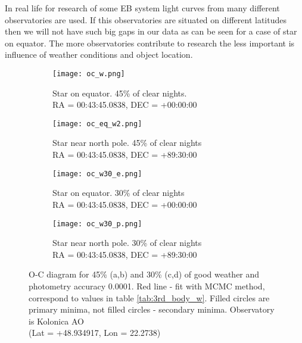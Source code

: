 In real life for research of some EB system light curves from many different observatories are used. If this observatories are situated on different latitudes then we will not have such big gaps in our data as can be seen for a case of star on equator. The more observatories contribute to research the less important is influence of weather conditions and object location.
\begin{figure}[!h]
    \centering
    \begin{subfigure}[t]{0.5\textwidth}
        \centering
        \texttt{[image: oc\_w.png]}
        \caption{Star on equator. 45\% of clear nights.\\RA = 00:43:45.0838, DEC = +00:00:00}
    \end{subfigure}%
    \begin{subfigure}[t]{0.5\textwidth}
        \centering
        \texttt{[image: oc\_eq\_w2.png]}
        \caption{Star near north pole. 45\% of clear nights\\RA = 00:43:45.0838, DEC = +89:30:00}
    \end{subfigure}
    
    \begin{subfigure}[t]{0.5\textwidth}
        \centering
        \texttt{[image: oc\_w30\_e.png]}
        \caption{Star on equator. 30\% of clear nights\\RA = 00:43:45.0838, DEC = +00:00:00}
    \end{subfigure}%
    \begin{subfigure}[t]{0.5\textwidth}
        \centering
        \texttt{[image: oc\_w30\_p.png]}
        \caption{Star near north pole. 30\% of clear nights\\RA = 00:43:45.0838, DEC = +89:30:00}
    \end{subfigure}
    \caption{O-C diagram for 45\% (a,b) and 30\% (c,d) of good weather and photometry accuracy 0.0001.
    Red line - fit with MCMC method, correspond to values in table \ref{tab:3rd_body_w}. Filled circles are primary minima, not filled circles - secondary minima. Observatory is Kolonica AO \\(Lat = +48.934917, Lon = 22.2738)}
\label{fig:oc_weather}
\end{figure}


